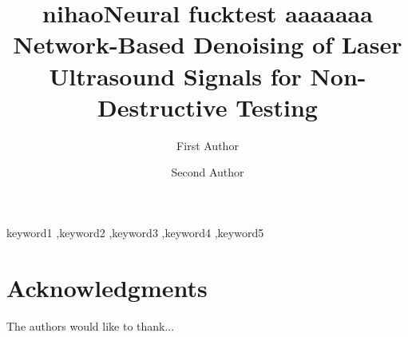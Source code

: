 \documentclass[review]{elsarticle}
\begin{document}
\begin{frontmatter}

\title{nihaoNeural fucktest aaaaaaa Network-Based Denoising of Laser Ultrasound Signals for Non-Destructive Testing}

\author[1]{First Author}
\author[2]{Second Author}






\begin{keyword}
keyword1 \sep keyword2 \sep keyword3 \sep keyword4 \sep keyword5
\end{keyword}

\end{frontmatter}

\linenumbers







\section*{Acknowledgments}
The authors would like to thank...



\end{document}

